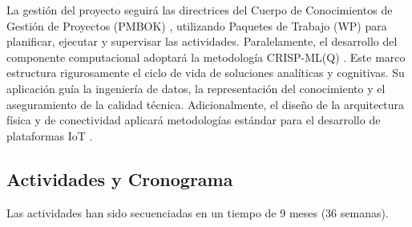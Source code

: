 \documentclass[12pt,letterpaper]{article}
\begin{document}
La gestión del proyecto seguirá las directrices del Cuerpo de Conocimientos de Gestión de Proyectos (PMBOK) \cite{pmi2017pmbok}, utilizando Paquetes de Trabajo (WP) para planificar, ejecutar y supervisar las actividades. Paralelamente, el desarrollo del componente computacional adoptará la metodología CRISP-ML(Q) \cite{studer2021crispml}. Este marco estructura rigurosamente el ciclo de vida de soluciones analíticas y cognitivas. Su aplicación guía la ingeniería de datos, la representación del conocimiento y el aseguramiento de la calidad técnica. Adicionalmente, el diseño de la arquitectura física y de conectividad aplicará metodologías estándar para el desarrollo de plataformas IoT \cite{senoo2023iot}.

\subsection{Actividades y Cronograma}

Las actividades han sido secuenciadas en un tiempo de 9 meses (36 semanas).
\end{document}
